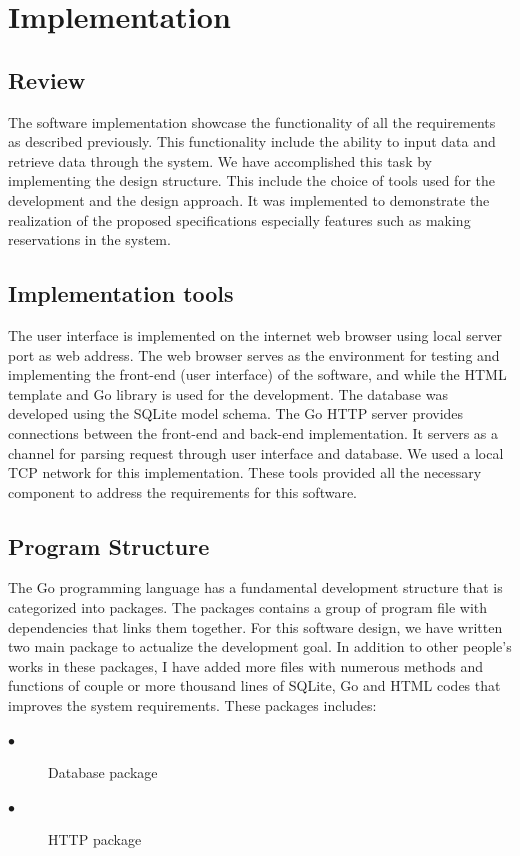 \chapter{Implementation}
\label{chap:ch4_abbr}
\label{chap:figtab}
\section{Review}
The software implementation showcase the functionality of all the requirements as described previously. This functionality include the ability to input data and retrieve data through the system. We have accomplished this task by implementing the design structure. This include the choice of tools used for the development and the design approach. It was implemented to demonstrate the realization of the proposed specifications especially features such as making reservations in the system.
\section{Implementation tools}
 The user interface is implemented on the internet web browser using local server port as web address. The web browser serves as the environment for testing and implementing the front-end (user interface) of the software, and while the HTML template and Go library is used for the development. The database was developed using the SQLite model schema. The Go HTTP server provides connections between the front-end and back-end implementation. It servers as a channel for parsing request through user interface and database. We used a local TCP network for this implementation.  These tools provided all the necessary component to address the requirements for this software. 
\section{Program Structure} \label{Programstructure}
The Go programming language has a fundamental development structure that is categorized into packages. The packages contains a group of program file with dependencies that links them together. For this software design, we have written two main package to actualize the development goal. In addition to other people's works in these packages, I have added more files with numerous methods and functions of couple or more thousand lines of SQLite, Go and HTML codes that improves the system requirements. These packages includes:
\begin{description}
\item[$\bullet$]Database package 
\item[$\bullet$]HTTP package 
\end{description}

